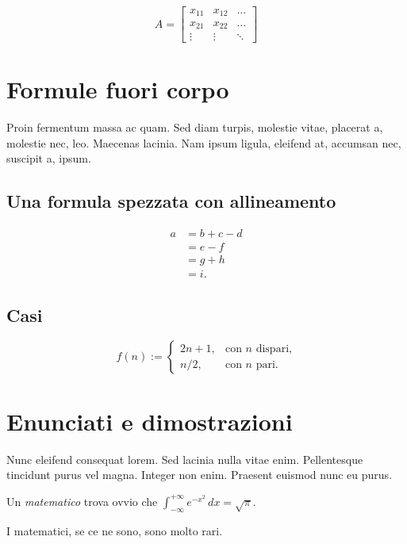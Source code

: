 \lipsum[2]
\begin{equation}
A=
\begin{bmatrix}
x_{11} & x_{12} & \dots \\
x_{21} & x_{22} & \dots \\
\vdots & \vdots & \ddots
\end{bmatrix}
\end{equation}



\section{Formule fuori corpo}

Proin fermentum massa ac quam. Sed diam turpis, molestie vitae, placerat a, molestie nec, leo. Maecenas lacinia. Nam ipsum ligula, eleifend at, accumsan nec, suscipit a, ipsum. 


\subsection{Una formula spezzata con allineamento}

\lipsum[2]
\begin{equation} 
\begin{split} 
a &= b+c-d \\ 
  &= e-f \\ 
  &= g+h \\ 
  &= i. 
\end{split} 
\end{equation}

 
\subsection{Casi}

\lipsum[3]
\begin{equation}
f(n):=
\begin{cases} 
2n+1, & \text{con $n$ dispari,} \\ 
n/2,  & \text{con $n$ pari.} 
\end{cases} 
\end{equation}



\section{Enunciati e dimostrazioni}

Nunc eleifend consequat lorem. Sed lacinia nulla vitae enim. Pellentesque tincidunt purus vel magna. Integer non enim. Praesent euismod nunc eu purus.
\begin{definizione}[di Gauss] 
Un \emph{matematico} trova ovvio che
$\int_{-\infty}^{+\infty}
e^{-x^2}\,dx=\sqrt{\pi}$. 
\end{definizione} 
\begin{teorema} 
I matematici, se ce ne sono, sono molto rari.
\end{teorema} 

